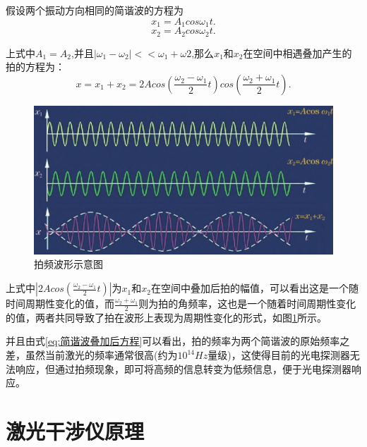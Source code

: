 假设两个振动方向相同的简谐波的方程为
\begin{equation}\label{eq:简谐波方程1}
    x_1=A_1cos\omega_1t.
\end{equation}
\begin{equation}\label{eq:简谐波方程2}
    x_2=A_2cos\omega_2t.
\end{equation}

上式中\(A_1=A_2\),并且\(|\omega_1-\omega_2|<<\omega_1+\omega2\),那么\(x_1\)和\(x_2\)在空间中相遇叠加产生的拍的方程为：
\begin{equation}\label{eq:简谐波叠加后方程}
   x=x_1+x_2=2Acos(\frac{\omega_2-\omega_1}{2}t)cos(\frac{\omega_2+\omega_1}{2}t).
\end{equation}

\begin{figure}[htb]
    \centering
    \includegraphics[width=12cm]{fig/2-fig/拍频波形示意图.jpg}
    \caption{拍频波形示意图\cite{激光外差干涉技术在光刻机中的应用}}
    \label{fig:拍频波形示意图}
    \end{figure}
上式中\(|2Acos(\frac{\omega_2-\omega_1}{2}t)|\)为\(x_1\)和\(x_2\)在空间中叠加后拍的幅值，可以看出这是一个随时间周期性变化的值，而\(\frac{\omega_2+\omega_1}{2}\)则为拍的角频率，这也是一个随着时间周期性变化的值，两者共同导致了拍在波形上表现为周期性变化的形式，如图\ref{fig:拍频波形示意图}所示。

并且由式\eqref{eq:简谐波叠加后方程}可以看出，拍的频率为两个简谐波的原始频率之差，虽然当前激光的频率通常很高(约为\(10^{14}Hz\)量级)，这使得目前的光电探测器无法响应\cite{激光外差干涉技术在光刻机中的应用}，但通过拍频现象，即可将高频的信息转变为低频信息，便于光电探测器响应。



\section{激光干涉仪原理}
